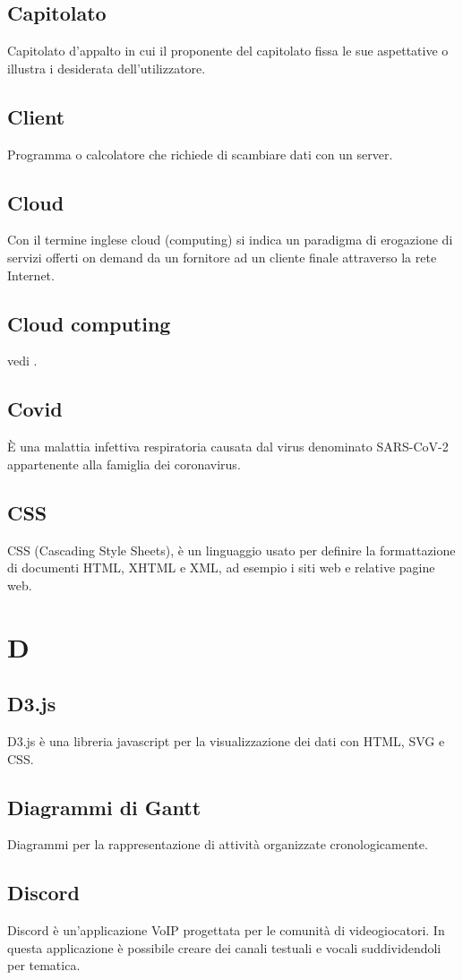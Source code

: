 \subsection{Capitolato} Capitolato d'appalto in cui il proponente del capitolato fissa le sue aspettative o illustra i desiderata dell'utilizzatore.
\subsection{Client} Programma o calcolatore che richiede di scambiare dati con un server.
\subsection{Cloud} Con il termine inglese cloud (computing) si indica un paradigma di erogazione di servizi offerti on demand da un fornitore ad un cliente finale attraverso la rete Internet.
\subsection{Cloud computing} vedi .
\subsection{Covid} È una malattia infettiva respiratoria causata dal virus denominato SARS-CoV-2 appartenente alla famiglia dei coronavirus.
\subsection{CSS} CSS (Cascading Style Sheets), è un linguaggio usato per definire la formattazione di documenti HTML, XHTML e XML, ad esempio i siti web e relative pagine web.
\newpage \section{D}
\subsection{D3.js} D3.js è una libreria javascript per la visualizzazione dei dati con HTML, SVG e CSS.
\subsection{Diagrammi di Gantt} Diagrammi per la rappresentazione di attività organizzate cronologicamente.
\subsection{Discord} Discord è un’applicazione VoIP progettata per le comunità di videogiocatori. In questa applicazione è possibile creare dei canali testuali e vocali suddividendoli per tematica.

